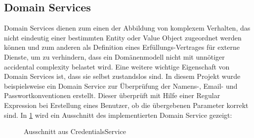 \subsection{Domain Services}
Domain Services dienen zum einen der Abbildung von komplexem Verhalten, das nicht eindeutig einer bestimmten Entity oder Value Object zugeordnet werden können und zum anderen als Definition eines \glqq Erfüllungs-Vertrages \grqq für externe Dienste, um zu verhindern, dass ein Domänenmodell nicht mit unnötiger \glqq accidental complexity \grqq belastet wird. Eine weitere wichtige Eigenschaft von Domain Services ist, dass sie selbst zustandslos sind.
\newline In diesem Projekt wurde beispielsweise ein Domain Service zur Überprüfung der Namens-, Email- und Passwortkonventionen erstellt. Dieser überprüft mit Hilfe einer Regular Expression bei Erstellung eines Benutzer, ob die übergebenen Parameter korrekt sind.
\newline In \ref{domServ} wird ein Ausschnitt des implementierten Domain Service gezeigt:
\begin{figure}[htbp]
    \centering
    \caption{\label{domServ} Ausschnitt aus CredentialsService}
\end{figure}

